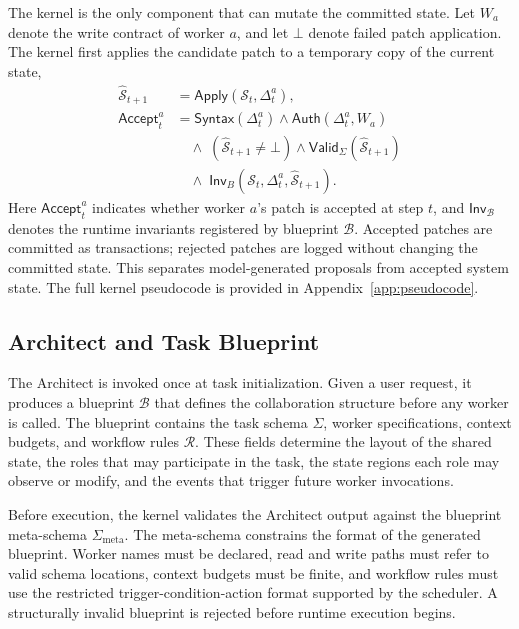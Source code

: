\documentclass[11pt]{article}
\newcommand{\state}{\mathcal{S}}
\newcommand{\schema}{\Sigma}
\newcommand{\metaschema}{\Sigma_{\mathrm{meta}}}
\newcommand{\rules}{\mathcal{R}}
\newcommand{\patch}{\Delta}
\begin{document}
The kernel is the only component that can mutate the committed state. Let $W_a$ denote the write contract of worker $a$, and let $\bot$ denote failed patch application. The kernel first applies the candidate patch to a temporary copy of the current state,
\begin{equation}
\label{eq:accept}
\begin{aligned}
\hat{\state}_{t+1}
&= \mathsf{Apply}(\state_t,\patch_t^a),\\
\mathsf{Accept}_t^a
&= \mathsf{Syntax}(\patch_t^a)
   \land \mathsf{Auth}(\patch_t^a,W_a)\\
&\quad \land\; (\hat{\state}_{t+1} \neq \bot)
   \land \mathsf{Valid}_{\schema}(\hat{\state}_{t+1})\\
&\quad \land\; \mathsf{Inv}_{B}
   (\state_t,\patch_t^a,\hat{\state}_{t+1}).
\end{aligned}
\end{equation}
Here $\mathsf{Accept}_t^a$ indicates whether worker $a$'s patch is accepted at step $t$, and $\mathsf{Inv}_{\mathcal{B}}$ denotes the runtime invariants registered by blueprint $\mathcal{B}$. Accepted patches are committed as transactions; rejected patches are logged without changing the committed state. This separates model-generated proposals from accepted system state. The full kernel pseudocode is provided in Appendix~\ref{app:pseudocode}.

\subsection{Architect and Task Blueprint}
\label{sec:architect}

The Architect is invoked once at task initialization. Given a user request, it produces a blueprint $\mathcal{B}$ that defines the collaboration structure before any worker is called. The blueprint contains the task schema $\schema$, worker specifications, context budgets, and workflow rules $\rules$. These fields determine the layout of the shared state, the roles that may participate in the task, the state regions each role may observe or modify, and the events that trigger future worker invocations.

Before execution, the kernel validates the Architect output against the blueprint meta-schema $\metaschema$. The meta-schema constrains the format of the generated blueprint. Worker names must be declared, read and write paths must refer to valid schema locations, context budgets must be finite, and workflow rules must use the restricted trigger-condition-action format supported by the scheduler. A structurally invalid blueprint is rejected before runtime execution begins.
\end{document}
